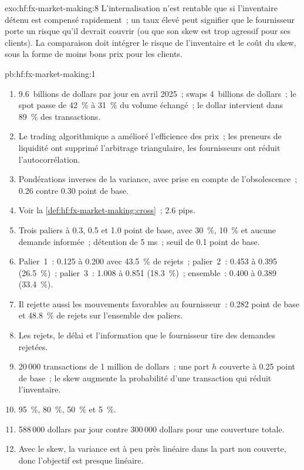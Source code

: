 \begin{solution}{exo:hf:fx-market-making:8}
L'internalisation n'est rentable que si l'inventaire détenu est compensé rapidement~; un taux élevé peut signifier que le fournisseur porte un risque qu'il devrait couvrir (ou que
son skew est trop agressif pour ses clients). La comparaison doit intégrer le risque de l'inventaire et le coût du skew, sous la forme de moins bons prix pour les clients.
\end{solution}

\begin{solution}{pb:hf:fx-market-making:1}
\begin{enumerate}
\item 9.6~billions de dollars par jour en avril 2025~; swaps 4~billions de dollars~; le spot passe de 42~\% à 31~\% du volume échangé~; le dollar intervient dans 89~\% des transactions.
\item Le trading algorithmique a amélioré l'efficience des prix~; les preneurs de liquidité ont supprimé l'arbitrage triangulaire, les fournisseurs ont réduit l'autocorrélation.
\item Pondérations inverses de la variance, avec prise en compte de l'obsolescence~; 0.26 contre 0.30 point de base.
\item Voir la \cref{def:hf:fx-market-making:cross}~; 2.6 pips.
\item Trois paliers à 0.3, 0.5 et 1.0 point de base, avec 30~\%, 10~\% et aucune demande informée~; détention de 5 ms~; seuil de 0.1 point de base.
\item Palier~1~: 0.125 à 0.200 avec 43.5~\% de rejets~; palier~2~: 0.453 à 0.395 (26.5~\%)~; palier~3~: 1.008 à 0.851 (18.3~\%)~; ensemble~: 0.400 à 0.389 (33.4~\%).
\item Il rejette aussi les mouvements favorables au fournisseur~: 0.282 point de base et 48.8~\% de rejets sur l'ensemble des paliers.
\item Les rejets, le délai et l'information que le fournisseur tire des demandes rejetées.
\item 20\,000 transactions de 1 million de dollars~; une part $h$ couverte à 0.25 point de base~; le skew augmente la probabilité d'une transaction qui réduit l'inventaire.
\item 95~\%, 80~\%, 50~\% et 5~\%.
\item 588\,000 dollars par jour contre 300\,000 dollars pour une couverture totale.
\item Avec le skew, la variance est à peu près linéaire dans la part non couverte, donc l'objectif est presque linéaire.

\end{enumerate}
\end{solution}
